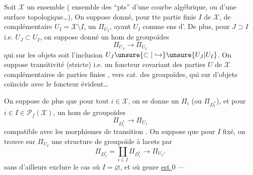 Soit $\mathcal{X}$ un ensemble \inserted{$\ne\varnothing$}
( ensemble des
``pts'' d'une  courbe algébrique,
ou d'une surface topologique\ldots), 
 On suppose
donné, pour tte partie finie $I$ de $\mathcal{X}$,
de complémentaire $U_I=\mathcal{X}\setminus I$, un
 $\Pi_{U_I}$, ayant $U_I$ comme ens
d'. De plus, pour $J\supset I$ i.e.
$U_J\subset U_I$, on suppose donné un hom
de groupoïdes
\[
\Pi_{U_J}\to\Pi_{U_I}
\]
qui sur les objets soit l'inclusion $U_J\unsure{\subset|\hookrightarrow}\unsure{U_J|U_I}$.
On suppose transitivité (stricte) i.e. 
un foncteur covariant  des parties $U$ de
$\mathcal{X}$ complémentaires de parties finies , vers
 cat. des groupoïdes, qui sur 
d'objets coïncide avec le foncteur évident\ldots


On suppose de plus que pour tout 
$i\in\mathcal{X}$, on se donne un 
$\Pi_i$ (ou $\Pi_{D_i^*}$),
et  pour $i\in I\in\mathcal{P}_f(\mathcal{X})$,
un hom de groupoïdes
\[
\Pi_{D_i^*}\to\Pi_{U_I}
\]
compatible avec les morphismes de transition
.
On suppose que pour $I$ fixé, on trouve
sur $\Pi_{U_I}$ une structure de groupoïde
à lacets par
\[
\Pi_{D_I^*}=\coprod_{i\in I}\Pi_{D_i^*}\to\Pi_{U_I}.
\]
sans d'ailleurs exclure le cas où $I=\varnothing$, et où   genre \uline{est $0$} --- 

